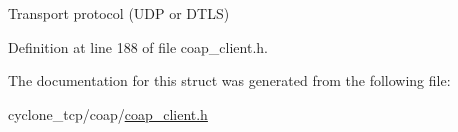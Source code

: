 Transport protocol (U\+DP or D\+T\+LS) 



Definition at line 188 of file coap\+\_\+client.\+h.



The documentation for this struct was generated from the following file\+:\begin{DoxyCompactItemize}
\item 
cyclone\+\_\+tcp/coap/\hyperlink{coap__client_8h}{coap\+\_\+client.\+h}\end{DoxyCompactItemize}

